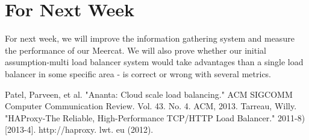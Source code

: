 \documentclass[11pt,letter]{article}
\begin{document}
\section{For Next Week}
For next week, we will improve the information gathering system and measure the performance of our Meercat. We will also prove whether our initial assumption-multi load balancer system would take advantages than a single load balancer in some specific area - is correct or wrong with several metrics. 

\begin{thebibliography}{9}
  Patel, Parveen, et al. "Ananta: Cloud scale load balancing." ACM SIGCOMM Computer Communication Review. Vol. 43. No. 4. ACM, 2013.
  Tarreau, Willy. "HAProxy-The Reliable, High-Performance TCP/HTTP Load Balancer." 2011-8)[2013-4]. http://haproxy. lwt. eu (2012).
\end{thebibliography}
\end{document}
